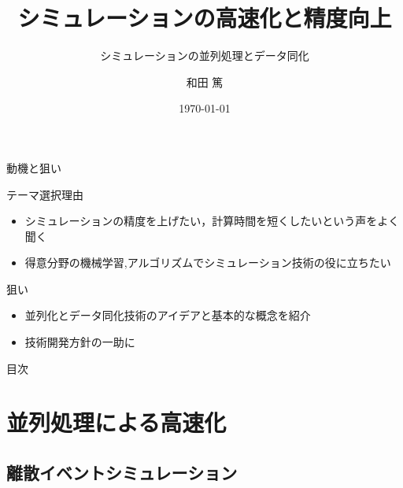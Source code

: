 \documentclass[dvipdfmx,uplatex,11pt]{beamer}
\title{シミュレーションの高速化と精度向上}
\subtitle{シミュレーションの並列処理とデータ同化}
\author{和田 篤}
\date{\today}
\theoremstyle{definition}
\begin{document}
\begin{frame}
  \maketitle
\end{frame}

\begin{frame}{動機と狙い}

  \begin{block}{テーマ選択理由}
   \begin{itemize}
      \item シミュレーションの精度を上げたい，計算時間を短くしたいという声をよく聞く
      \item 得意分野の機械学習,アルゴリズムでシミュレーション技術の役に立ちたい
    \end{itemize}
  \end{block}

  \begin{block}{狙い}
   \begin{itemize}
      \item 並列化とデータ同化技術のアイデアと基本的な概念を紹介
      \item 技術開発方針の一助に
    \end{itemize}
  \end{block}

\end{frame}

\begin{frame}{目次}
  \tableofcontents
\end{frame}

\section{並列処理による高速化}
\subsection{離散イベントシミュレーション}
\end{document}
